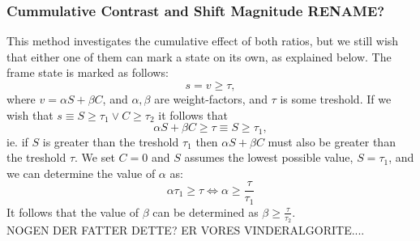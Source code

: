 \subsubsection{Cummulative Contrast and Shift Magnitude RENAME?}
This method investigates the cumulative effect of both ratios, but we still wish that either one of them can mark a state on its own, as explained below. The frame state is marked as follows:\\
\[
s = v \ge \tau,
\]
where 
$v = \alpha S + \beta C$, and $\alpha,\beta$ are weight-factors, and %
$\tau$ is some treshold. If we wish that $s \equiv S \ge \tau_{1} \vee C \ge \tau_{2}$ it follows that
%
\[
 \alpha S + \beta C \ge \tau \equiv  S \ge \tau_{1},
\]
%
ie. if $S$ is greater than the treshold $\tau_{1}$ then $\alpha S + \beta C$ must also be greater than the treshold $\tau$.%
 We set $C = 0$ and $S$ assumes the lowest possible value, $S = \tau_{1}$, and we can determine the value of $\alpha$ as:
%
\[
\alpha \tau_{1} \ge \tau \Leftrightarrow \alpha \ge \frac{\tau}{\tau_{1}}
\]
%
It follows that the value of $\beta$ can be determined as $\beta \ge \frac{\tau}{\tau_{2}}$.
\\NOGEN DER FATTER DETTE? ER VORES VINDERALGORITE....
%
%
%
